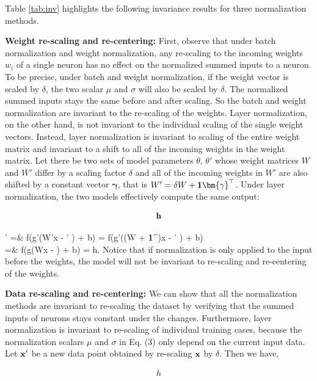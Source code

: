Table \ref{tab:inv} highlights the following invariance results for three normalization methods. 

{\textbf{Weight re-scaling and re-centering:}} First, observe that under batch normalization and weight normalization, any re-scaling to the incoming weights ${w}_i$ of a single neuron has no effect on the normalized summed inputs to a neuron.  To be precise, under batch and weight normalization, if the weight vector is scaled by $\delta$, the two scalar $\mu$ and $\sigma$ will also be scaled by $\delta$. The normalized summed inputs stays the same before and after scaling. So the batch and weight normalization are invariant to the re-scaling of the weights. Layer normalization, on the other hand,  is not invariant to the individual scaling of the single weight vectors. Instead, layer normalization is invariant to scaling of the entire weight matrix and invariant to a shift to all of the incoming weights in the weight matrix. Let there be two sets of model parameters $\theta$, $\theta'$ whose weight matrices $W$ and $W'$ differ by a scaling factor $\delta$ and all of the incoming weights in $W'$ are also shifted by a constant vector $\bm\gamma$, that is $W' = \delta W + {\bf 1}{\bm{\gamma}}^\top$. Under layer normalization, the two models effectively compute the same output:

\begin{align}\bold h\end{align}

' =& f({{\bold g}\over\sigma'}\left(W'{\bold x} - \mu' \right) + {\bold b}) = f({{\bold g}\over\sigma'}\left((\delta W + {\bf 1}{\bm{\gamma}}^\top){\bold x} - \mu' \right) + {\bold b}) \nonumber \\
=& f({{\bold g}\over\sigma}\left(W{\bold x} - \mu \right) + {\bold b}) = {\bold h}.
\eea
Notice that if normalization is only applied to the input before the weights, the model will not be invariant to re-scaling and re-centering of the weights.

{\textbf{Data re-scaling and re-centering:}} We can show that all the normalization methods are invariant to re-scaling the dataset by verifying that the summed inputs of neurons stays constant under the changes. Furthermore, layer normalization is invariant to re-scaling of individual training cases, because the normalization scalars $\mu$ and $\sigma$ in Eq. (3) only depend on the current input data. Let ${\bold x}'$ be a new data point obtained by re-scaling ${\bold x}$ by $\delta$. Then we have,

\begin{align}h\end{align}

